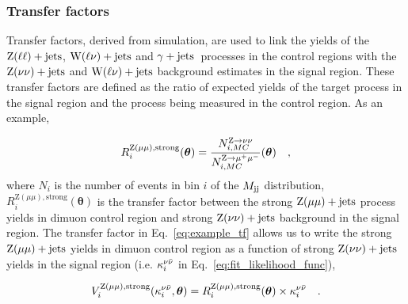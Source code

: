
\subsubsection{Transfer factors}
\label{subsubsec:transfer_factors}

Transfer factors, derived from simulation,
are used to link the yields of the $\mathrm{Z}(\ell\ell)+\textrm{jets}$, $\textrm{W}(\ell\nu)+\textrm{jets}$ and $\gamma+\textrm{jets}$~processes in the control
regions with the $\textrm{Z}(\nu\nu)+\textrm{jets}$ and $\textrm{W}(\ell\nu)+\textrm{jets}$ background estimates in the signal region.
These transfer factors are defined as the ratio of expected yields of the target process
in the signal region and the process being measured in the control region. As an example,

\begin{equation}
  R_{i}^{\mathrm{Z}(\mu\mu), \mathrm{strong}}(\boldsymbol{\theta}) = \frac{N_{i,MC}^{\mathrm{Z}\to\nu\nu}}{N_{i,MC}^{\mathrm{Z}\to\mu^+\mu^-}}(\boldsymbol{\theta}) \quad ,
  \label{eq:example_tf}
\end{equation}
where $N_{i}$ is the number of events in bin $i$ of the $M_{\textrm{jj}}$ distribution, 
$R_{i}^{\mathrm{Z}(\mu\mu), \mathrm{strong}}(\boldsymbol{\theta})$ is the transfer factor between the 
strong $\mathrm{Z}(\mu\mu)+\textrm{jets}$ process yields in dimuon control region 
and strong $\textrm{Z}(\nu\nu)+\textrm{jets}$ background in the signal region. The transfer factor in
Eq.~\ref{eq:example_tf} allows us to write the strong $\mathrm{Z}(\mu\mu)+\textrm{jets}$ yields
in dimuon control region as a function of strong $\textrm{Z}(\nu\nu)+\textrm{jets}$ yields in the signal region
(i.e. $\kappa_{i}^{\nu\bar{\nu}}$ in Eq.~\ref{eq:fit_likelihood_func}),

\begin{equation}
  V_{i}^{\mathrm{Z}(\mu\mu), \mathrm{strong}}(\kappa_{i}^{\nu\bar{\nu}},\boldsymbol{\theta}) = R_{i}^{\mathrm{Z}(\mu\mu), \mathrm{strong}}(\boldsymbol{\theta}) \times \kappa_{i}^{\nu\bar{\nu}} \quad .
\end{equation}

